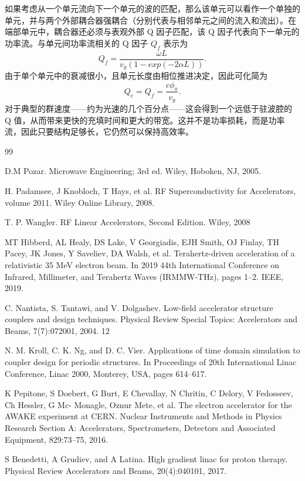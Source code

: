 \documentclass{cernyrep}
\begin{document}
如果考虑从一个单元流向下一个单元的波的匹配，那么该单元可以看作一个单独的单元，并与两个外部耦合器强耦合（分别代表与相邻单元之间的流入和流出）。在端部单元中，耦合器还必须与表观外部 Q 因子匹配，该 Q 因子代表向下一单元的功率流。与单元间功率流相关的 Q 因子 $Q_f$ 表示为
\begin{equation}
Q_f=\frac{\omega L}{v_g (1-exp(-2 \alpha L))}.
\end{equation}
由于单个单元中的衰减很小，且单元长度由相位推进决定，因此可化简为
\begin{equation}
Q_e=Q_f=\frac{c \phi_a}{v_g}.
\end{equation}
对于典型的群速度——约为光速的几个百分点——这会得到一个远低于驻波腔的 Q 值，从而带来更快的充填时间和更大的带宽。这并不是功率损耗，而是功率流，因此只要结构足够长，它仍然可以保持高效率。
\newpage
\begin{thebibliography}{99}

%
%





D.M Pozar. Microwave Engineering; 3rd ed. Wiley, Hoboken, NJ, 2005.


H. Padamsee, J Knobloch, T Hays, et al. RF Superconductivity for Accelerators, volume 2011. Wiley
Online Library, 2008.



T. P. Wangler. RF Linear Accelerators, Second Edition. Wiley, 2008

MT Hibberd, AL Healy, DS Lake, V Georgiadis, EJH Smith, OJ Finlay, TH Pacey, JK Jones,
Y Saveliev, DA Walsh, et al. Terahertz-driven acceleration of a relativistic 35 MeV electron beam.
In 2019 44th International Conference on Infrared, Millimeter, and Terahertz Waves (IRMMW-THz),
pages 1–2. IEEE, 2019.

C. Nantista, S. Tantawi, and V. Dolgashev. Low-field accelerator structure couplers and design
techniques. Physical Review Special Topics: Accelerators and Beams, 7(7):072001, 2004.
12

N. M. Kroll, C. K. Ng, and D. C. Vier. Applications of time domain simulation to coupler design for
periodic structures. In Proceedings of 20th International Linac Conference, Linac 2000, Monterey,
USA, pages 614–617.


K Pepitone, S Doebert, G Burt, E Chevallay, N Chritin, C Delory, V Fedosseev, Ch Hessler, G Mc-
Monagle, Oznur Mete, et al. The electron accelerator for the AWAKE experiment at CERN. Nuclear
Instruments and Methods in Physics Research Section A: Accelerators, Spectrometers, Detectors and
Associated Equipment, 829:73–75, 2016.


S Benedetti, A Grudiev, and A Latina. High gradient linac for proton therapy. Physical Review
Accelerators and Beams, 20(4):040101, 2017.



\end{thebibliography}
\end{document}
